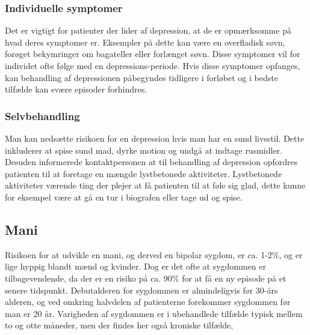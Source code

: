 \subsubsection{Individuelle symptomer}
Det er vigtigt for patienter der lider af depression, at de er opmærksomme på hvad deres symptomer er.
Eksempler på dette kan være en overfladisk søvn, forøget bekymringer om bagateller eller forlænget søvn.
Disse symptomer vil for individet ofte følge med en depressions-periode.
Hvis disse symptomer opfanges, kan behandling af depressionen påbegyndes tidligere i forløbet og i bedste tilfælde kan svære episoder forhindres.
\subsubsection{Selvbehandling}
Man kan nedsætte risikoen for en depression hvis man har en sund livsstil.
Dette inkluderer at spise sund mad, dyrke motion og undgå at indtage rusmidler.
Desuden informerede kontaktpersonen \citet{misc:janne-rasmussen} at til behandling af depression opfordres patienten til at foretage en mængde lystbetonede aktiviteter.
Lystbetonede aktiviteter værende ting der plejer at få patienten til at føle sig glad, dette kunne for eksempel være at gå en tur i biografen eller tage ud og spise. 

\subsection{Mani}
Risikoen for at udvikle en mani, og derved en bipolar sygdom, er ca. 1-2\%, og er lige hyppig blandt mænd og kvinder.
Dog er det ofte at sygdommen er tilbagevendende, da der er en risiko på ca. 90\% for at få en ny episode på et senere tidspunkt.
Debutalderen for sygdommen er almindeligvis før 30-års alderen, og ved omkring halvdelen af patienterne forekommer sygdommen før man er 20 år.
Varigheden af sygdommen er i ubehandlede tilfælde typisk mellem to og otte måneder, men der findes her også kroniske tilfælde,

